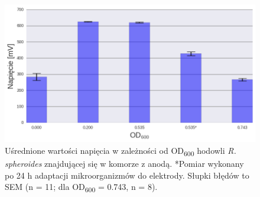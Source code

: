 \begin{figure}
    \centering
    \includegraphics[width=12cm]{figures/voltage3}
    \caption{
        Uśrednione wartości napięcia w zależności od OD\textsubscript{600}
        hodowli \textit{R. spheroides} znajdującej się w komorze z anodą.
        *Pomiar wykonany po 24 h adaptacji mikroorganizmów do elektrody.
        Słupki błędów to SEM (n = 11; dla OD\textsubscript{600} = 0.743, n = 8).
    }
    \label{fig:4}
\end{figure}

